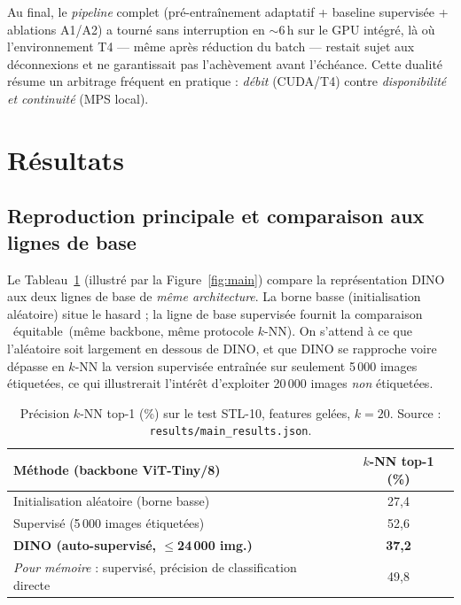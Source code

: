 \documentclass[11pt,a4paper]{article}
\begin{document}
Au final, le \emph{pipeline} complet (pré-entraînement adaptatif + baseline supervisée + ablations
A1/A2) a tourné sans interruption en $\sim$6\,h sur le GPU intégré, là où l'environnement T4 ---
même après réduction du batch --- restait sujet aux déconnexions et ne garantissait pas l'achèvement
avant l'échéance. Cette dualité résume un arbitrage fréquent en pratique :
\emph{débit} (CUDA/T4) contre \emph{disponibilité et continuité} (MPS local).

\section{Résultats}

\subsection{Reproduction principale et comparaison aux lignes de base}
Le Tableau~\ref{tab:main} (illustré par la Figure~\ref{fig:main}) compare la représentation DINO aux
deux lignes de base de \emph{même architecture}. La borne basse (initialisation aléatoire) situe le hasard ; la ligne de base
supervisée fournit la comparaison \guillemotleft\ équitable\,\guillemotright{} (même backbone, même protocole $k$-NN). On s'attend à ce que l'aléatoire soit largement en dessous de DINO, et que DINO se rapproche
voire dépasse en $k$-NN la version supervisée entraînée sur seulement 5\,000 images étiquetées,
ce qui illustrerait l'intérêt d'exploiter 20\,000 images \emph{non} étiquetées.

\begin{table}[h]
\centering
\caption[Résultats $k$-NN principaux]{Précision $k$-NN top-1 (\%) sur le test STL-10, features gelées, $k=20$.
Source : \texttt{results/main\_results.json}.}
\label{tab:main}
\begin{tabular}{lc}
\toprule
\textbf{Méthode (backbone ViT-Tiny/8)} & \textbf{$k$-NN top-1 (\%)} \\
\midrule
Initialisation aléatoire (borne basse)        & 27,4 \\
Supervisé (5\,000 images étiquetées)          & 52,6 \\
\textbf{DINO (auto-supervisé, $\leq$24\,000 img.)}  & \textbf{37,2} \\
\midrule
\emph{Pour mémoire} : supervisé, précision de classification directe & 49,8 \\
\bottomrule
\end{tabular}
\end{table}
\end{document}

